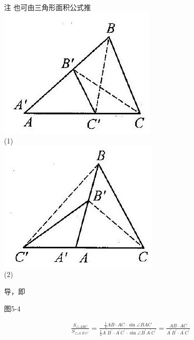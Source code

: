 \documentclass[10pt]{article}
\begin{document}
注 也可由三角形面积公式推\\
\includegraphics[max width=\textwidth, center]{2024_10_30_2c8f45efd4a519b08e1ag-049}\\
(1)\\
\includegraphics[max width=\textwidth, center]{2024_10_30_2c8f45efd4a519b08e1ag-049(2)}\\
(2)

导，即

图5-4

\begin{align*}
\frac{S_{\triangle A B C}}{S_{\triangle A^{\prime} B^{\prime} C^{\prime}}}=\frac{\frac{1}{2} A B \cdot A C \cdot \sin \angle B A C}{\frac{1}{2} A^{\prime} B^{\prime} \cdot A^{\prime} C^{\prime} \cdot \sin \angle B^{\prime} A^{\prime} C^{\prime}}=\frac{A B \cdot A C}{A^{\prime} B^{\prime} \cdot A^{\prime} C^{\prime}}
\end{align*}
\end{document}
